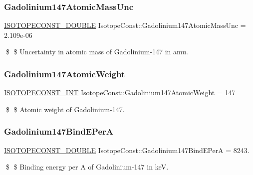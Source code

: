 \subsubsection{\texorpdfstring{Gadolinium147\+Atomic\+Mass\+Unc}{Gadolinium147AtomicMassUnc}}
{\footnotesize\ttfamily \mbox{\hyperlink{group___isotope_const-_macros_ga8f45a7272ce02c0b4c65c44636ed719a}{I\+S\+O\+T\+O\+P\+E\+C\+O\+N\+S\+T\+\_\+\+D\+O\+U\+B\+LE}} Isotope\+Const\+::\+Gadolinium147\+Atomic\+Mass\+Unc = 2.\+109e-\/06}

\$ \$ Uncertainty in atomic mass of Gadolinium-\/147 in amu. \mbox{\label{group___isotope_const-_gadolinium-_gd147_gaedc4f3ce2032b1fc06d3db75ed9b4ac9}} 
\subsubsection{\texorpdfstring{Gadolinium147\+Atomic\+Weight}{Gadolinium147AtomicWeight}}
{\footnotesize\ttfamily \mbox{\hyperlink{group___isotope_const-_macros_ga5f18360b3e99483a35c32d789e62621c}{I\+S\+O\+T\+O\+P\+E\+C\+O\+N\+S\+T\+\_\+\+I\+NT}} Isotope\+Const\+::\+Gadolinium147\+Atomic\+Weight = 147}

\$ \$ Atomic weight of Gadolinium-\/147. \mbox{\label{group___isotope_const-_gadolinium-_gd147_ga466a77da3fa56205e655e0ad7b4e1b63}} 
\subsubsection{\texorpdfstring{Gadolinium147\+Bind\+E\+PerA}{Gadolinium147BindEPerA}}
{\footnotesize\ttfamily \mbox{\hyperlink{group___isotope_const-_macros_ga8f45a7272ce02c0b4c65c44636ed719a}{I\+S\+O\+T\+O\+P\+E\+C\+O\+N\+S\+T\+\_\+\+D\+O\+U\+B\+LE}} Isotope\+Const\+::\+Gadolinium147\+Bind\+E\+PerA = 8243.}

\$ \$ Binding energy per A of Gadolinium-\/147 in keV. \mbox{\label{group___isotope_const-_gadolinium-_gd147_ga8f73e97e2b24239ee71e0661c7b4069e}} 
